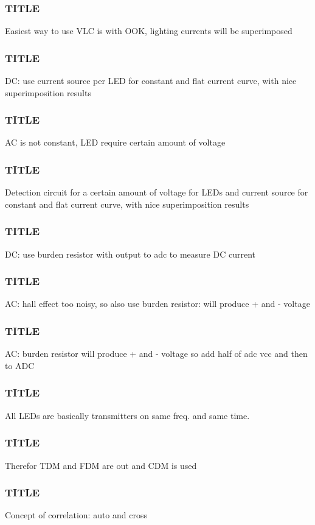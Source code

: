 \documentclass{beamer}
\begin{document}
	\begin{frame}\frametitle{TITLE}
		Easiest way to use VLC is with OOK, lighting currents will be superimposed
	\end{frame}



	\begin{frame}\frametitle{TITLE}
		DC: use current source per LED for constant and flat current curve, with nice superimposition results
	\end{frame}

	\begin{frame}\frametitle{TITLE}
		AC is not constant, LED require certain amount of voltage
	\end{frame}

	\begin{frame}\frametitle{TITLE}
		Detection circuit for a certain amount of voltage for LEDs and current source for constant and flat current curve, with nice superimposition results
	\end{frame}

	\begin{frame}\frametitle{TITLE}
		DC: use burden resistor with output to adc to measure DC current
	\end{frame}

	\begin{frame}\frametitle{TITLE}
		AC: hall effect too noisy, so also use burden resistor: will produce + and - voltage
	\end{frame}

	\begin{frame}\frametitle{TITLE}
		AC: burden resistor will produce + and - voltage so add half of adc vcc and then to ADC
	\end{frame}





	\begin{frame}\frametitle{TITLE}
		All LEDs are basically transmitters on same freq. and same time.
	\end{frame}

	\begin{frame}\frametitle{TITLE}
		Therefor TDM and FDM are out and CDM is used
	\end{frame}

	\begin{frame}\frametitle{TITLE}
		Concept of correlation: auto and cross
	\end{frame}
\end{document}
